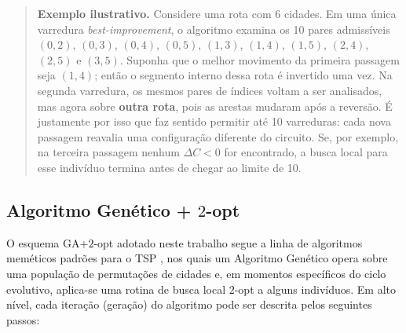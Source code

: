 \begin{quote}
  \textbf{Exemplo ilustrativo.} Considere
  uma rota com 6 cidades. Em uma única varredura \emph{best-improvement},
  o algoritmo examina os 10 pares admissíveis \((0,2)\), \((0,3)\),
  \((0,4)\), \((0,5)\), \((1,3)\), \((1,4)\), \((1,5)\), \((2,4)\),
  \((2,5)\) e \((3,5)\). Suponha que o melhor movimento da primeira
  passagem seja \((1,4)\); então o segmento interno dessa rota é invertido
  uma vez. Na segunda varredura, os mesmos pares de índices voltam a ser
  analisados, mas agora sobre \textbf{outra rota}, pois as arestas mudaram
  após a reversão. É justamente por isso que faz sentido permitir até 10
  varreduras: cada nova passagem reavalia uma configuração diferente do
  circuito. Se, por exemplo, na terceira passagem nenhum \(\Delta C < 0\)
  for encontrado, a busca local para esse indivíduo termina antes de
  chegar ao limite de 10.
\end{quote}

\subsection{Algoritmo Genético + \(2\)-opt}\label{sec-251-ga-2opt}

O esquema GA+\(2\)-opt adotado neste trabalho segue a linha de
algoritmos meméticos padrões para o TSP \autocite{larranaga1999genetic},
nos quais um Algoritmo Genético opera sobre uma população de permutações
de cidades e, em momentos específicos do ciclo evolutivo, aplica-se uma
rotina de busca local \(2\)-opt a alguns indivíduos. Em alto nível, cada
iteração (geração) do algoritmo pode ser descrita pelos seguintes
passos:

